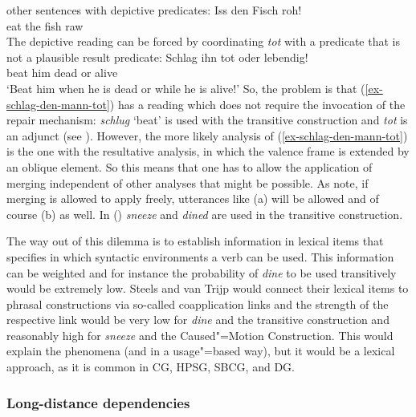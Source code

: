 other sentences with depictive predicates:
\ea
\gll Iss den Fisch roh!\\
     eat the fish raw\\
\z
The depictive reading can be forced by coordinating \emph{tot} with a predicate that is not a
plausible result predicate:
\ea
\gll Schlag ihn tot oder lebendig!\\
     beat   him dead or alive\\
\glt `Beat him when he is dead or while he is alive!'
\z
So, the problem is that (\ref{ex-schlag-den-mann-tot}) has a reading which does not require the invocation of the repair mechanism: \emph{schlug} `beat' is used with the transitive
construction and \emph{tot} is an adjunct (see \citealp{Winkler97a}). However, the more likely analysis of (\ref{ex-schlag-den-mann-tot}) is the one
with the resultative analysis, in which the valence frame is extended by an oblique element. So this
means that one has to allow the application of merging independent of other analyses that might be possible.
As \citet[]{SvT2011a} note, if merging is allowed to apply freely, utterances like
(a) will be allowed and of course (b) as well.
\eal
{}
\zl
In () \emph{sneeze} and \emph{dined} are used in the transitive construction.

The way out of this dilemma is to establish information in lexical items that specifies in which
syntactic environments a verb can be used. This information can be weighted and for instance the
probability of \emph{dine} to be used transitively would be extremely low. Steels and van Trijp
would connect their lexical items to phrasal constructions via so-called coapplication links and the
strength of the respective link would be very low for \emph{dine} and the transitive construction and
reasonably high for \emph{sneeze} and the Caused"=Motion Construction. This would explain the
phenomena (and in a usage"=based way), but it would be a lexical approach, as it is common in CG, HPSG,
SBCG, and DG.

\subsubsection{Long-distance dependencies}
\label{sec-fcg-nld}

